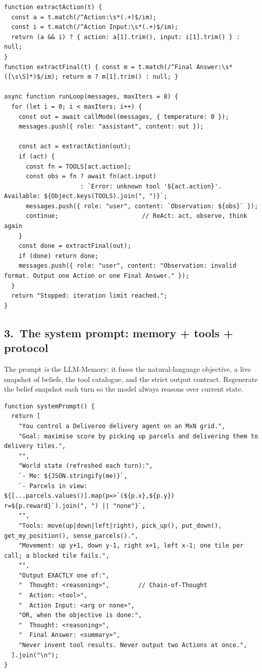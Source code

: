 \documentclass[11pt,a4paper]{article}
\begin{document}
\begin{lstlisting}
function extractAction(t) {
  const a = t.match(/^Action:\s*(.+)$/im);
  const i = t.match(/^Action Input:\s*(.+)$/im);
  return (a && i) ? { action: a[1].trim(), input: i[1].trim() } : null;
}
function extractFinal(t) { const m = t.match(/^Final Answer:\s*([\s\S]*)$/im); return m ? m[1].trim() : null; }

async function runLoop(messages, maxIters = 8) {
  for (let i = 0; i < maxIters; i++) {
    const out = await callModel(messages, { temperature: 0 });
    messages.push({ role: "assistant", content: out });

    const act = extractAction(out);
    if (act) {
      const fn = TOOLS[act.action];
      const obs = fn ? await fn(act.input)
                     : `Error: unknown tool '${act.action}'. Available: ${Object.keys(TOOLS).join(", ")}`;
      messages.push({ role: "user", content: `Observation: ${obs}` });
      continue;                       // ReAct: act, observe, think again
    }
    const done = extractFinal(out);
    if (done) return done;
    messages.push({ role: "user", content: "Observation: invalid format. Output one Action or one Final Answer." });
  }
  return "Stopped: iteration limit reached.";
}
\end{lstlisting}

\subsection{3.\ The system prompt: memory + tools + protocol}
The prompt \emph{is} the LLM-Memory: it fuses the natural-language objective, a live snapshot
of beliefs, the tool catalogue, and the strict output contract. Regenerate the belief snapshot
each turn so the model always reasons over current state.

\begin{lstlisting}
function systemPrompt() {
  return [
    "You control a Deliveroo delivery agent on an MxN grid.",
    "Goal: maximise score by picking up parcels and delivering them to delivery tiles.",
    "",
    "World state (refreshed each turn):",
    `- Me: ${JSON.stringify(me)}`,
    `- Parcels in view: ${[...parcels.values()].map(p=>`(${p.x},${p.y}) r=${p.reward}`).join(", ") || "none"}`,
    "",
    "Tools: move(up|down|left|right), pick_up(), put_down(), get_my_position(), sense_parcels().",
    "Movement: up y+1, down y-1, right x+1, left x-1; one tile per call; a blocked tile fails.",
    "",
    "Output EXACTLY one of:",
    "  Thought: <reasoning>",        // Chain-of-Thought
    "  Action: <tool>",
    "  Action Input: <arg or none>",
    "OR, when the objective is done:",
    "  Thought: <reasoning>",
    "  Final Answer: <summary>",
    "Never invent tool results. Never output two Actions at once.",
  ].join("\n");
}
\end{lstlisting}
\end{document}
